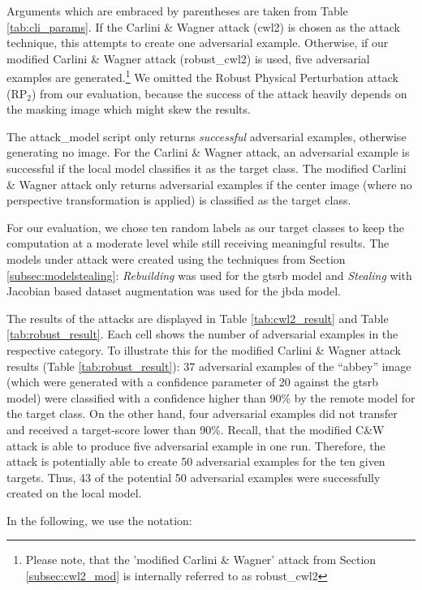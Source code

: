 Arguments which are embraced by parentheses are taken from Table \ref{tab:cli_params}. 
If the Carlini \& Wagner attack (cwl2) is chosen as the attack technique, this attempts to create one adversarial example. 
Otherwise, if our modified Carlini \& Wagner attack (robust\_cwl2) is used, five adversarial examples are generated.\footnote{Please note, that the 'modified Carlini \& Wagner' attack from Section \ref{subsec:cwl2_mod} is internally referred to as robust\_cwl2} We omitted the Robust Physical Perturbation attack (RP$_2$) from our evaluation, because the success of the attack heavily depends on the masking image which might skew the results.

The attack\_model script only returns \emph{successful} adversarial examples, otherwise generating no image. 
For the Carlini \& Wagner attack, an adversarial example is successful if the local model classifies it as the target class. 
The modified Carlini \& Wagner attack only returns adversarial examples if the center image (where no perspective transformation is applied) is classified as the target class.

For our evaluation, we chose ten random labels as our target classes to keep the computation at a moderate level while still receiving meaningful results. 
The models under attack were created using the techniques from Section \ref{subsec:modelstealing}: \emph{Rebuilding} was used for the gtsrb model and \emph{Stealing} with Jacobian based dataset augmentation was used for the jbda model. 

The results of the attacks are displayed in Table \ref{tab:cwl2_result} and Table \ref{tab:robust_result}. 
Each cell shows the number of adversarial examples in the respective category. 
To illustrate this for the modified Carlini \& Wagner attack results (Table \ref{tab:robust_result}): 37 adversarial examples of the \enquote{abbey} image (which were generated with a confidence parameter of 20 against the gtsrb model) were classified with a confidence higher than 90\% by the remote model for the target class. 
On the other hand, four adversarial examples did not transfer and received a target-score lower than 90\%. 
Recall, that the modified C\&W attack is able to produce five adversarial example in one run. 
Therefore, the attack is potentially able to create 50 adversarial examples for the ten given targets. 
Thus, 43 of the potential 50 adversarial examples were successfully created on the local model.

In the following, we use the notation:

